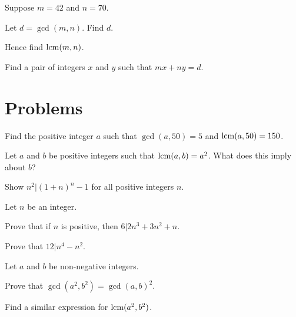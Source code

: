 \begin{exercise}
    Suppose $m = 42$ and $n = 70$.
    \begin{partquestions}{\roman*}
        \item Let $d = \gcd(m,n)$. Find $d$.
        \item Hence find $\mathrm{lcm}(m,n)$.
        \item Find a pair of integers $x$ and $y$ such that $mx + ny = d$.
    \end{partquestions}
\end{exercise}

\newpage

\section{Problems}
\begin{problem}
    Find the positive integer $a$ such that $\gcd(a, 50) = 5$ and $\mathrm{lcm}(a, 50) = 150$.
\end{problem}

\begin{problem}
    Let $a$ and $b$ be positive integers such that $\mathrm{lcm}(a, b) = a^2$. What does this imply about $b$?
\end{problem}

\begin{problem}
    Show $n^2 \vert (1+n)^n - 1$ for all positive integers $n$.
\end{problem}

\begin{problem}
    Let $n$ be an integer.
    \begin{partquestions}{\roman*}
        \item Prove that if $n$ is positive, then $6 \vert 2n^3 + 3n^2 + n$.
        \item Prove that $12 \vert n^4 - n^2$.
    \end{partquestions}
\end{problem}

\begin{problem}
    Let $a$ and $b$ be non-negative integers.
    \begin{partquestions}{\roman*}
        \item Prove that $\gcd(a^2, b^2) = \gcd(a,b)^2$.
        \item Find a similar expression for $\mathrm{lcm}(a^2, b^2)$.
    \end{partquestions}
\end{problem}
